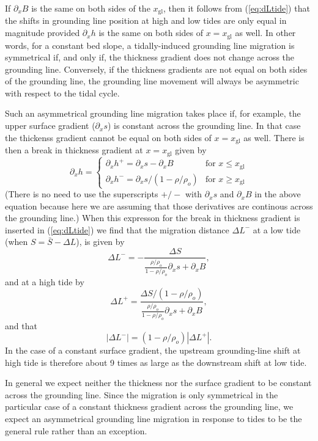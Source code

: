 \documentclass[10pt,a4paper]{book}
\newcommand{\p}{\partial}
\newcommand{\xgl}{x_{\mathrm{gl}}}
\begin{document}
If $\p_x B$ is the same on both sides of the $\xgl$, then it follows
from (\ref{eq:dLtide}) that the shifts in grounding line position at
high and low tides are only equal in magnitude provided $\p_x h$ is
the same on both sides of $x=\xgl$ as well. In other words, for a
constant bed slope, a tidally-induced grounding line migration is
symmetrical if, and only if, the thickness gradient does not change
across the grounding line. Conversely, if the thickness
gradients are not equal on both sides of the grounding line, the
grounding line movement will always be asymmetric with respect to the tidal
cycle.

Such an asymmetrical grounding line migration takes place if,
for example, the upper surface gradient ($\p_x s$) is constant across
the grounding line. In that case the thickenss gradient cannot be
equal on both sides of $x=\xgl$ as well.  There is then a break in
thickness gradient at $x=\xgl$ given by
\[
\p_x h= \begin{cases} \p_x h^{+}=\p_x s - \p_x B & \text{for } x \leq \xgl \\
                      \p_x h^{-}=\p_x s/(1-\rho/\rho_o) & \text{for } x \geq \xgl
        \end{cases} 
\]
(There is no need to use the superscripts $+/-$ with $\p_x s$ and
$\p_x B$ in the above equation because here we are assuming that those
derivatives are continous across the grounding line.)  When this
expresson for the break in thickness gradient is inserted in
(\ref{eq:dLtide}) we find that the migration distance $\Delta L^{-}$
at a low tide (when $S=\bar{S}-\Delta L$), is given by
\[
\Delta L^{-} = - \frac{\Delta S}{\frac{\rho/\rho_o}{1-\rho/\rho_o} \p_x s + \p_x B} ,
\]
and at a high tide by
\[
\Delta L^{+} = \frac{\Delta S/(1-\rho/\rho_o) }{\frac{\rho/\rho_o}{1-\rho/\rho_o} \p_x s + \p_x B} ,
\]
and that
\[
|\Delta L^{-}| = (1-\rho/\rho_o) | \Delta L^{+}| .
\] 
In the case of a constant surface gradient, the upstream
grounding-line shift at high tide is therefore about 9 times as large
as the downstream shift at low tide.



In general we expect neither the thickness nor the surface gradient to
be constant across the grounding line. Since the migration is only
symmetrical in the particular case of a constant thickness gradient
across the grounding line, we expect an asymmetrical grounding line
migration in response to tides to be the general rule rather than an exception.
\end{document}
